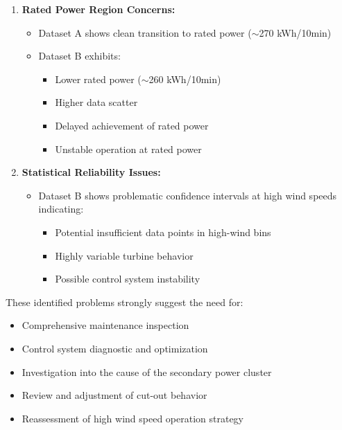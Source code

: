 \documentclass[a4paper,11pt]{article}
\begin{document}
\begin{mdframed}[linecolor=red,linewidth=2pt]
{\begin{enumerate}
    \item \textbf{Rated Power Region Concerns:}
    \begin{itemize}
        \item Dataset A shows clean transition to rated power ($\sim$270 kWh/10min)
        \item Dataset B exhibits:
        \begin{itemize}
            \item Lower rated power ($\sim$260 kWh/10min)
            \item Higher data scatter
            \item Delayed achievement of rated power
            \item Unstable operation at rated power
        \end{itemize}
    \end{itemize}

    \item \textbf{Statistical Reliability Issues:}
    \begin{itemize}
        \item Dataset B shows problematic confidence intervals at high wind speeds indicating:
        \begin{itemize}
            \item Potential insufficient data points in high-wind bins
            \item Highly variable turbine behavior
            \item Possible control system instability
        \end{itemize}
    \end{itemize}
\end{enumerate}

These identified problems strongly suggest the need for:
\begin{itemize}
    \item Comprehensive maintenance inspection
    \item Control system diagnostic and optimization
    \item Investigation into the cause of the secondary power cluster
    \item Review and adjustment of cut-out behavior
    \item Reassessment of high wind speed operation strategy
\end{itemize}
} %
\end{mdframed}

\newpage
\end{document}
